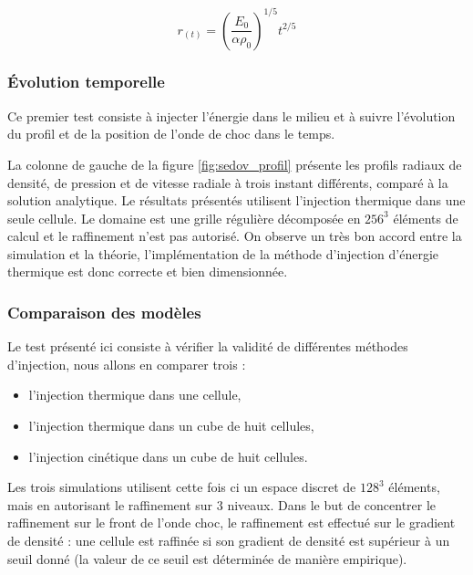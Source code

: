 \begin{equation}
r_{(t)}=\left( \frac{E_0}{\alpha \rho_0 }\right)^{1/5} t^{2/5}
\end{equation}


\subsubsection{Évolution temporelle }


Ce premier test consiste à injecter l'énergie dans le milieu et à suivre l'évolution du profil et de la position de l'onde de choc dans le temps.

La colonne de gauche de la figure \ref{fig:sedov_profil} présente les profils radiaux de densité, de pression et de vitesse radiale à trois instant différents, comparé à la solution analytique.
Le résultats présentés utilisent l'injection thermique dans une seule cellule.
Le domaine est une grille régulière décomposée en $256^3$ éléments de calcul et le raffinement n'est pas autorisé.
On observe un très bon accord entre la simulation et la théorie, l'implémentation de la méthode d'injection d'énergie thermique est donc correcte et bien dimensionnée.

\subsubsection{Comparaison des modèles}

Le test présenté ici consiste à vérifier la validité de différentes méthodes d'injection, nous allons en comparer trois : 
\begin{itemize}
\item l'injection thermique dans une cellule,
\item l'injection thermique dans un cube de huit cellules,
\item l'injection cinétique dans un cube de huit cellules.
\end{itemize}

Les trois simulations utilisent cette fois ci un espace discret de $128^3$ éléments, mais en autorisant le raffinement sur 3 niveaux.
Dans le but de concentrer le raffinement sur le front de l'onde choc, le raffinement est effectué sur le gradient de densité : une cellule est raffinée si son gradient de densité est supérieur à un seuil donné (la valeur de ce seuil est déterminée de manière empirique).

